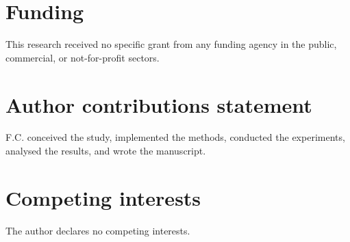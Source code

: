 \documentclass[fleqn,10pt]{wlscirep}
\begin{document}
\section*{Funding}
This research received no specific grant from any funding agency in the public, commercial, or not-for-profit sectors.

\section*{Author contributions statement}
F.C. conceived the study, implemented the methods, conducted the experiments, analysed the results, and wrote the manuscript.

\section*{Competing interests}
The author declares no competing interests.
\end{document}
